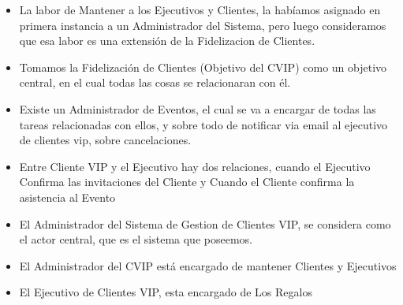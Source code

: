 \begin{itemize}
	\item La labor de Mantener a los Ejecutivos y Clientes, la hab\'iamos asignado en primera instancia a un Administrador
		del Sistema, pero luego consideramos que esa labor es una extensi\'on de la Fidelizacion de Clientes.
	\item Tomamos la Fidelizaci\'on de Clientes (Objetivo del CVIP) como un objetivo central, en el cual todas las cosas se relacionaran con \'el.
	\item Existe un Administrador de Eventos, el cual se va a encargar de todas las tareas relacionadas con ellos, y sobre todo de notificar via email al ejecutivo
		de clientes vip, sobre cancelaciones.
	\item Entre Cliente VIP y el Ejecutivo hay dos relaciones, cuando el Ejecutivo Confirma las invitaciones del Cliente y Cuando el Cliente confirma la asistencia al Evento
	\item El Administrador del Sistema de Gestion de Clientes VIP, se considera como el actor central, que es el sistema que poseemos.
	\item El Administrador del CVIP est\'a encargado de mantener Clientes y Ejecutivos
	\item El Ejecutivo de Clientes VIP, esta encargado de Los Regalos
\end{itemize}
